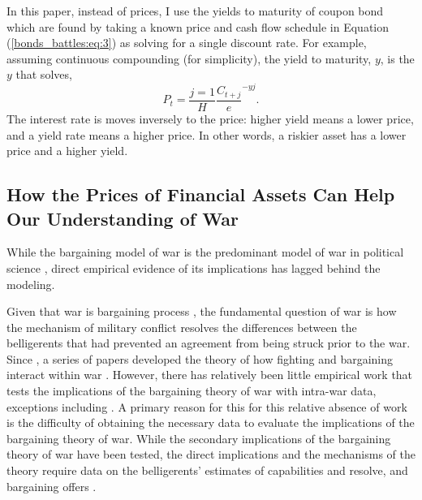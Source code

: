 In this paper, instead of prices, I use the yields to maturity of coupon bond which are found by taking a known price and cash flow schedule in Equation (\ref{bonds_battles:eq:3}) as solving for a single discount rate.
For example, assuming continuous compounding (for simplicity), the yield to maturity, $y$, is the $y$ that solves,
\begin{equation}
  \label{bonds_battles:eq:5}
  P_{t} = \frac{j = 1}{H} \frac{C_{t + j}} e^{-y j} \text{.}
\end{equation}
The interest rate is moves inversely to the price: higher yield means a lower price, and a yield rate means a higher price.
In other words, a riskier asset has a lower price and a higher yield.



\subsection{How the Prices of Financial Assets Can Help Our Understanding of War}
\label{bonds_battles:sec:how-prices-financial-1}

While the bargaining model of war \parencites{Fearon1995}{Powell2006} is the predominant model of war in political science \parencite{Reiter2003}, direct empirical evidence of its implications has lagged behind the modeling. 

Given that war is bargaining process \parencite{Fearon1995}, the fundamental question of war is how the mechanism of military conflict resolves the differences between the belligerents that had prevented an agreement from being struck prior to the war.
Since \textcite{Fearon1995}, a series of papers developed the theory of how fighting and bargaining interact within war \parencites{FilsonWerner2002}{Slantchev2003}{SmithStam2004}{Powell2004}{LeventogluSlantchev2007}{LangloisLanglois2009}{WolfordReiterCarrubba2011}.
However, there has relatively been little empirical work that tests the implications of the bargaining theory of war with intra-war data, exceptions including \textcites{Goemans2000}{Ramsay2008}{Reiter2009}{Weisiger2013}{Weisiger2015}.
A primary reason for this for this relative absence of work is the difficulty of obtaining the necessary data to evaluate the implications of the bargaining theory of war.
While the secondary implications of the bargaining theory of war have been tested, the direct implications and the mechanisms of the theory require data on the belligerents' estimates of capabilities and resolve, and bargaining offers \parencite[32]{Reiter2003}.

